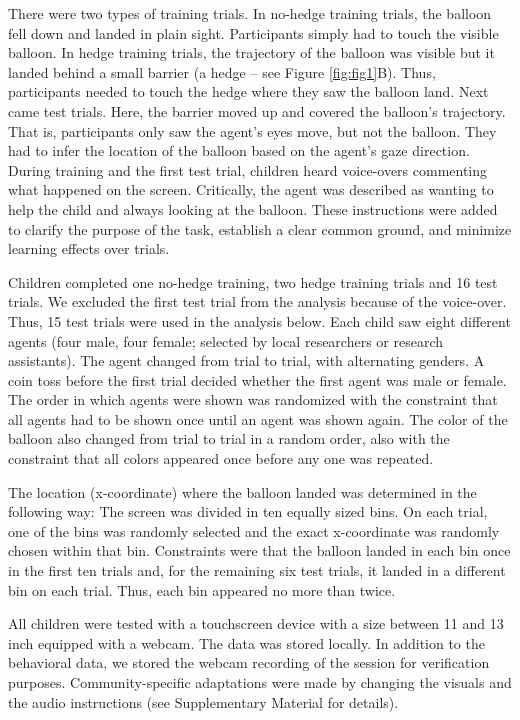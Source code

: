 \documentclass[
  man,floatsintext]{apa7}
\begin{document}
There were two types of training trials. In no-hedge training trials, the balloon fell down and landed in plain sight. Participants simply had to touch the visible balloon. In hedge training trials, the trajectory of the balloon was visible but it landed behind a small barrier (a hedge -- see Figure \ref{fig:fig1}B). Thus, participants needed to touch the hedge where they saw the balloon land. Next came test trials. Here, the barrier moved up and covered the balloon's trajectory. That is, participants only saw the agent's eyes move, but not the balloon. They had to infer the location of the balloon based on the agent's gaze direction. During training and the first test trial, children heard voice-overs commenting what happened on the screen. Critically, the agent was described as wanting to help the child and always looking at the balloon. These instructions were added to clarify the purpose of the task, establish a clear common ground, and minimize learning effects over trials.

Children completed one no-hedge training, two hedge training trials and 16 test trials. We excluded the first test trial from the analysis because of the voice-over. Thus, 15 test trials were used in the analysis below. Each child saw eight different agents (four male, four female; selected by local researchers or research assistants). The agent changed from trial to trial, with alternating genders. A coin toss before the first trial decided whether the first agent was male or female. The order in which agents were shown was randomized with the constraint that all agents had to be shown once until an agent was shown again. The color of the balloon also changed from trial to trial in a random order, also with the constraint that all colors appeared once before any one was repeated.

The location (x-coordinate) where the balloon landed was determined in the following way: The screen was divided in ten equally sized bins. On each trial, one of the bins was randomly selected and the exact x-coordinate was randomly chosen within that bin. Constraints were that the balloon landed in each bin once in the first ten trials and, for the remaining six test trials, it landed in a different bin on each trial. Thus, each bin appeared no more than twice.

All children were tested with a touchscreen device with a size between 11 and 13 inch equipped with a webcam. The data was stored locally. In addition to the behavioral data, we stored the webcam recording of the session for verification purposes. Community-specific adaptations were made by changing the visuals and the audio instructions (see Supplementary Material for details).
\end{document}
